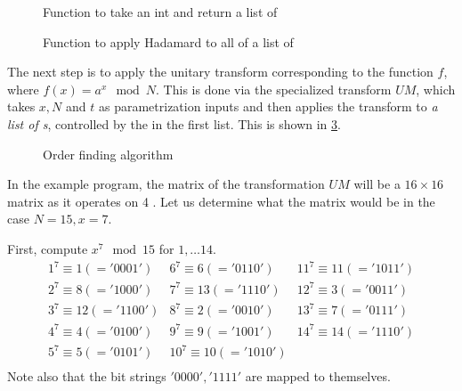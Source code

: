\begin{figure}[htbp]

\caption{Function to take an int and return a list of \qbits}
\label{fig:intToZeroqbitlist}
\end{figure}

\begin{figure}[htbp]

\caption{Function to apply Hadamard to all of a list of \qbits}\label{fig:hadList}
\end{figure}

The next step is to apply the unitary transform corresponding to the
function $f$, where $f(x) = a^x \mod N$. This is done via the 
specialized transform $UM$, which takes $x,N$ and $t$ as parametrization
inputs and then applies the transform to \emph{a list of \qbit{}s}, controlled
by the  in the first list. This is
shown in \ref{fig:orderfind}.

\begin{figure}[htbp]

\caption{Order finding algorithm}
\label{fig:orderfind}
\end{figure}

In the example program, the 
 matrix of the transformation $UM$ will be a $16\times 16$ matrix
as it operates on 4 \qbits. Let us determine what the matrix would be 
in the case $N=15, x=7$. 

First, compute $x^7\mod 15$ for $1,\ldots 14$.
\[\begin{array}{ccc}
1^7\equiv 1(= '0001')&6^7\equiv 6(= '0110')&11^7\equiv 11(='1011') \\
2^7\equiv 8(= '1000')&7^7\equiv 13(= '1110')&12^7\equiv 3(='0011') \\
3^7\equiv 12(= '1100')&8^7\equiv 2(= '0010')&13^7\equiv 7(='0111') \\
4^7\equiv 4(= '0100')&9^7\equiv 9(= '1001')&14^7\equiv 14(='1110') \\
5^7\equiv 5(= '0101')&10^7\equiv 10(= '1010')&\\
\end{array}\]
Note also that the bit strings $'0000', '1111'$ are mapped to themselves.

